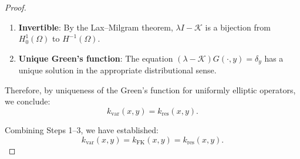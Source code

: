 \documentclass[11pt,a4paper]{article}
\newcommand{\Koop}{\mathcal{K}}
\begin{document}
\begin{proof}
\begin{enumerate}
\textit{Corrected coercivity estimate:} Combining drift and diffusion contributions:
\begin{align}
\Re\langle (\lambda - \Koop)u, u \rangle &= \Re(\lambda)\|u\|_{L^2}^2 - \Re\langle \Koop u, u \rangle \notag\\
&= \Re(\lambda)\|u\|_{L^2}^2 + \frac{1}{2}\int_\Omega (\nabla \cdot G)|u|^2 \, dx + \frac{1}{2}\int_\Omega \nabla u^\top a \nabla u \, dx.
\end{align}
To bound the drift divergence term:
\begin{equation}
\frac{1}{2} \int_\Omega (\nabla \cdot G)|u|^2 \, dx \geq -\frac{1}{2} \|(\nabla \cdot G)^-\|_{L^\infty} \|u\|_{L^2}^2.
\end{equation}
Therefore, the \textbf{corrected coercivity estimate} is:
\begin{equation}\label{eq:corrected_coercivity}
\boxed{\Re\langle (\lambda - \Koop)u, u \rangle \geq \left(\Re(\lambda) - \frac{1}{2}\|(\nabla \cdot G)^-\|_{L^\infty}\right) \|u\|_{L^2}^2 + \frac{\nu}{2}\|\nabla u\|_{L^2}^2.}
\end{equation}

Under the condition $\Re(\lambda) > \lambda_0 := \frac{1}{2}\|(\nabla \cdot G)^-\|_{L^\infty}$, coercivity is established.

\item \textbf{Invertible}: By the Lax--Milgram theorem, $\lambda I - \Koop$ is a bijection from $H^1_0(\Omega)$ to $H^{-1}(\Omega)$.

\item \textbf{Unique Green's function}: The equation $(\lambda - \Koop)G(\cdot, y) = \delta_y$ has a unique solution in the appropriate distributional sense.
\end{enumerate}

Therefore, by uniqueness of the Green's function for uniformly elliptic operators, we conclude:
\begin{equation}
k_{\mathrm{var}}(x,y) = k_{\mathrm{res}}(x,y).
\end{equation}

Combining Steps 1--3, we have established:
\begin{equation}
k_{\mathrm{var}}(x,y) = k_{\mathrm{FK}}(x,y) = k_{\mathrm{res}}(x,y).
\end{equation}
\end{proof}
\end{document}
